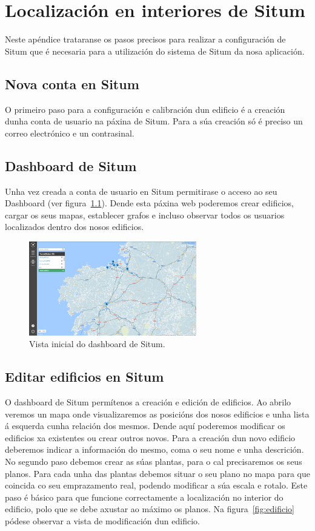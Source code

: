 \chapter{Localización en interiores de Situm}
Neste apéndice trataranse os pasos precisos para realizar a configuración de Situm que é necesaria para a utilización do sistema de Situm da nosa aplicación.

\section{Nova conta en Situm}
O primeiro paso para a configuración e calibración dun edificio é a creación dunha conta de usuario na páxina de Situm. Para a súa creación só é preciso un correo electrónico e un contrasinal.

\section{Dashboard de Situm}
Unha vez creada a conta de usuario en Situm permitirase o acceso ao seu Dashboard (ver figura~\ref{fig:dashboard}). Dende esta páxina web poderemos crear edificios, cargar os seus mapas, establecer grafos e incluso observar todos os usuarios localizados dentro dos nosos edificios.

\begin{figure}[tbh] 
	\begin{center}
		\includegraphics[width=0.65\textwidth]{figures/Capturas/dashboard}
		\caption{Vista inicial do dashboard de Situm.}
		\label{fig:dashboard}
	\end{center}
\end{figure}

\section{Editar edificios en Situm}
O dashboard de Situm permítenos a creación e edición de edificios. Ao abrilo veremos un mapa onde visualizaremos as posicións dos nosos edificios e unha lista á esquerda cunha relación dos mesmos. Dende aquí poderemos modificar os edificios xa existentes ou crear outros novos.
Para a creación dun novo edificio deberemos indicar a información do mesmo, coma o seu nome e unha descrición. No segundo paso debemos crear as súas plantas, para o cal precisaremos os seus planos. Para cada unha das plantas debemos situar o seu plano no mapa para que coincida co seu emprazamento real, podendo modificar a súa escala e rotalo. Este paso é básico para que funcione correctamente a localización no interior do edificio, polo que se debe axustar ao máximo os planos.
Na figura~\ref{fig:edificio} pódese observar a vista de modificación dun edificio.

